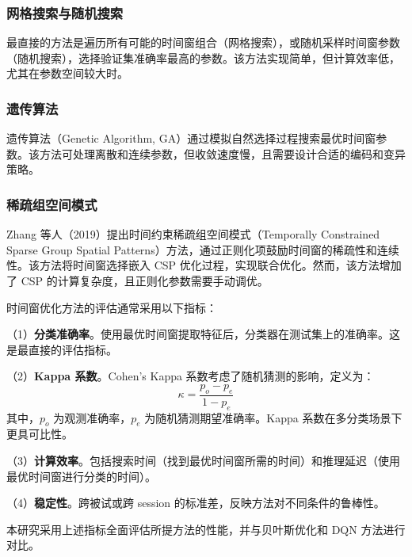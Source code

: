 \subsubsection{网格搜索与随机搜索}

最直接的方法是遍历所有可能的时间窗组合（网格搜索），或随机采样时间窗参数（随机搜索），选择验证集准确率最高的参数。该方法实现简单，但计算效率低，尤其在参数空间较大时。

\subsubsection{遗传算法}

遗传算法（Genetic Algorithm, GA）通过模拟自然选择过程搜索最优时间窗参数。该方法可处理离散和连续参数，但收敛速度慢，且需要设计合适的编码和变异策略。

\subsubsection{稀疏组空间模式}

Zhang 等人（2019）提出时间约束稀疏组空间模式（Temporally Constrained Sparse Group Spatial Patterns）方法，通过正则化项鼓励时间窗的稀疏性和连续性\cite{zhang2019temporally}。该方法将时间窗选择嵌入 CSP 优化过程，实现联合优化。然而，该方法增加了 CSP 的计算复杂度，且正则化参数需要手动调优。

\label{subsec:evaluation_metrics}

时间窗优化方法的评估通常采用以下指标\cite{tangermann2012review}：

（1）\textbf{分类准确率}。使用最优时间窗提取特征后，分类器在测试集上的准确率。这是最直接的评估指标。

（2）\textbf{Kappa 系数}。Cohen's Kappa 系数考虑了随机猜测的影响，定义为：
\begin{equation}
\kappa = \frac{p_o - p_e}{1 - p_e}
\end{equation}
其中，$p_o$ 为观测准确率，$p_e$ 为随机猜测期望准确率\cite{cohen1960coefficient}。Kappa 系数在多分类场景下更具可比性。

（3）\textbf{计算效率}。包括搜索时间（找到最优时间窗所需的时间）和推理延迟（使用最优时间窗进行分类的时间）\cite{yang2015time}。

（4）\textbf{稳定性}。跨被试或跨 session 的标准差，反映方法对不同条件的鲁棒性\cite{lotte2011regularizing}。

本研究采用上述指标全面评估所提方法的性能，并与贝叶斯优化和 DQN 方法进行对比。

